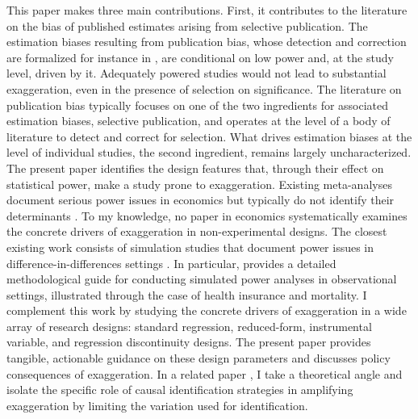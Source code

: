 \documentclass[12pt]{article}
\begin{document}
		 This paper makes three main contributions. First, it contributes to the literature on the bias of published estimates arising from selective publication. The estimation biases resulting from publication bias, whose detection and correction are formalized for instance in \cite{andrews_identification_2019}, are conditional on low power and, at the study level, driven by it. Adequately powered studies would not lead to substantial exaggeration, even in the presence of selection on significance. The literature on publication bias typically focuses on one of the two ingredients for associated estimation biases, selective publication, and operates at the level of a body of literature to detect and correct for selection. What drives estimation biases at the level of individual studies, the second ingredient, remains largely uncharacterized. The present paper identifies the design features that, through their effect on statistical power, make a study prone to exaggeration. Existing meta-analyses document serious power issues in economics but typically do not identify their determinants \citep{ioannidis_power_2017, ferraro_feature_2020, young_consistency_2022, arel-bundock_quantitative_2024}. To my knowledge, no paper in economics systematically examines the concrete drivers of exaggeration in non-experimental designs. The closest existing work consists of simulation studies that document power issues in difference-in-differences settings  \citep{schell_evaluating_2018, griffin_moving_2021, black_simulated_2022}. In particular, \cite{black_simulated_2022} provides a detailed methodological guide for conducting simulated power analyses in observational settings, illustrated through the case of health insurance and mortality. I complement this work by studying the concrete drivers of exaggeration in a wide array of research designs: standard regression, reduced-form, instrumental variable, and regression discontinuity designs. The present paper provides tangible, actionable guidance on these design parameters and discusses policy consequences of exaggeration. In a related paper \citep{bagilet_causal_2026}, I take a theoretical angle and isolate the specific role of causal identification strategies in amplifying exaggeration by limiting the variation used for identification.
		 
\end{document}
